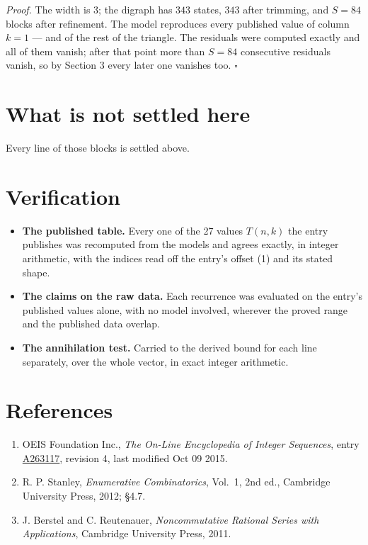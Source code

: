\documentclass[11pt]{article}
\theoremstyle{definition}
\begin{document}
{\itshape Proof.} The width is $3$; the digraph has $343$ states, $343$ after trimming, and $S = 84$ blocks after refinement. The model reproduces every published value of column $k = 1$ --- and of the rest of the triangle. The residuals were computed exactly and all of them vanish; after that point more than $S = 84$ consecutive residuals vanish, so by Section 3 every later one vanishes too. $\square$

\section{What is not settled here}

Every line of those blocks is settled above.

\section{Verification}

\begin{itemize}

\item {\bfseries The published table.} Every one of the 27 values $T(n,k)$ the entry publishes was recomputed from the models and agrees exactly, in integer arithmetic, with the indices read off the entry's offset (1) and its stated shape.

\item {\bfseries The claims on the raw data.} Each recurrence was evaluated on the entry's published values alone, with no model involved, wherever the proved range and the published data overlap.

\item {\bfseries The annihilation test.} Carried to the derived bound for each line separately, over the whole vector, in exact integer arithmetic.

\end{itemize}

\section{References}

\begin{enumerate}

\item OEIS Foundation Inc., \emph{The On-Line Encyclopedia of Integer Sequences}, entry \href{https://oeis.org/A263117}{A263117}, revision 4, last modified Oct 09 2015.

\item R. P. Stanley, \emph{Enumerative Combinatorics}, Vol.~1, 2nd ed., Cambridge University Press, 2012; \S4.7.

\item J. Berstel and C. Reutenauer, \emph{Noncommutative Rational Series with Applications}, Cambridge University Press, 2011.

\end{enumerate}
\end{document}
